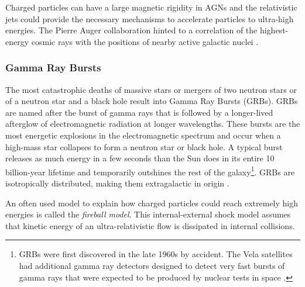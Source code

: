 Charged particles can have a large magnetic rigidity in AGNs and the relativistic jets could provide the necessary mechanisms to accelerate particles to ultra-high energies. The Pierre Auger collaboration hinted to a correlation of the highest-energy cosmic rays with the positions of nearby active galactic nuclei \cite{Abraham:2007si}.

\subsubsection{Gamma Ray Bursts}
\label{subsubsec:grb}
The most catastrophic deaths of massive stars or mergers of two neutron stars or of a neutron star and a black hole result into Gamma Ray Bursts (GRBs). GRBs are named after the burst of gamma rays that is followed by a longer-lived afterglow of electromagnetic radiation at longer wavelengths. These bursts are the most energetic explosions in the electromagnetic spectrum and occur when a high-mass star collapses to form a neutron star or black hole. A typical burst releases as much energy in a few seconds than the Sun does in its entire 10 billion-year lifetime and temporarily outshines the rest of the galaxy\footnote{GRBs were first discovered in the late 1960s by accident. The Vela satellites had additional gamma ray detectors designed to detect very fast bursts of gamma rays that were expected to be produced by nuclear tests in space \cite{Klebesadel:1973iq}.}. GRBs are isotropically distributed, making them extragalactic in origin \cite{Meegan:1992xg}.

An often used model to explain how charged particles could reach extremely high energies is called the \textit{fireball model}. This internal-external shock model assumes that kinetic energy of an ultra-relativistic flow is dissipated in internal collisions. \\

